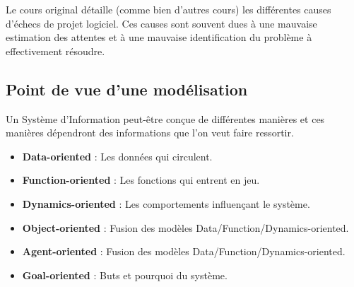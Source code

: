 \documentclass[../Syllabus.tex]{subfiles}
\begin{document}
Le cours original détaille (comme bien d'autres cours) les différentes causes d'échecs de projet logiciel. Ces causes sont souvent dues à une mauvaise estimation des attentes et à une mauvaise identification du problème à effectivement résoudre.

\subsection{Point de vue d'une modélisation}

Un Système d'Information peut-être conçue de différentes manières et ces manières dépendront des informations que l'on veut faire ressortir.

\begin{itemize}
  \item \textbf{Data-oriented} : Les données qui circulent.
  \item \textbf{Function-oriented} : Les fonctions qui entrent en jeu.
  \item \textbf{Dynamics-oriented} : Les comportements influençant le système.
  \item \textbf{Object-oriented} : Fusion des modèles {Data/Function/Dynamics}-oriented.
  \item \textbf{Agent-oriented} : Fusion des modèles {Data/Function/Dynamics}-oriented.
  \item \textbf{Goal-oriented} : Buts et pourquoi du système.
\end{itemize}
\end{document}
